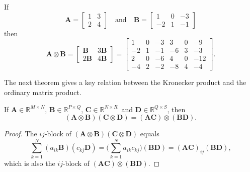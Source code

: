 \begin{example}\label{example: Kronecker product}
If
\[
\boldsymbol{A}=\begin{bmatrix}1&3\\ 2&4\end{bmatrix}
\quad\text{and}\quad
\boldsymbol{B}=\begin{bmatrix}1&0&-3\\ -2&1&-1\end{bmatrix}
\]
then
\[
\boldsymbol{A}\otimes\boldsymbol{B}
=\begin{bmatrix}
 \boldsymbol{B}&3\boldsymbol{B}\\
2\boldsymbol{B}&4\boldsymbol{B} 
\end{bmatrix}
=\left[\begin{array}{ccc|ccc}
 1& 0&-3& 3& 0&-9\\
-2& 1&-1&-6& 3&-3\\             
\hline
 2& 0&-6& 4& 0&-12\\
-4& 2&-2&-8& 4&-4
\end{array}\right].
\]
\end{example}

The next theorem gives a key relation between the Kronecker product and the 
ordinary matrix product.

\begin{theorem}\label{thm: Kronecker A B C D}
If $\boldsymbol{A}\in\mathbb{R}^{M\times N}$,
$\boldsymbol{B}\in\mathbb{R}^{P\times Q}$,
$\boldsymbol{C}\in\mathbb{R}^{N\times R}$~and
$\boldsymbol{D}\in\mathbb{R}^{Q\times S}$, then
\[
(\boldsymbol{A}\otimes\boldsymbol{B})(\boldsymbol{C}\otimes\boldsymbol{D})
=(\boldsymbol{A}\boldsymbol{C})\otimes(\boldsymbol{B}\boldsymbol{D}).
\]
\end{theorem}
\begin{proof}
The $ij$-block of 
$(\boldsymbol{A}\otimes\boldsymbol{B})(\boldsymbol{C}\otimes\boldsymbol{D})$ 
equals
\[
\sum_{k=1}^N(a_{ik}\boldsymbol{B})(c_{kj}\boldsymbol{D})
    =\biggl(\sum_{k=1}^Na_{ik}c_{kj}\biggr)(\boldsymbol{B}\boldsymbol{D})
    =(\boldsymbol{A}\boldsymbol{C})_{ij}(\boldsymbol{B}\boldsymbol{D}),
\]
which is also the $ij$-block of
$(\boldsymbol{A}\boldsymbol{C})\otimes(\boldsymbol{B}\boldsymbol{D})$.
\end{proof}

